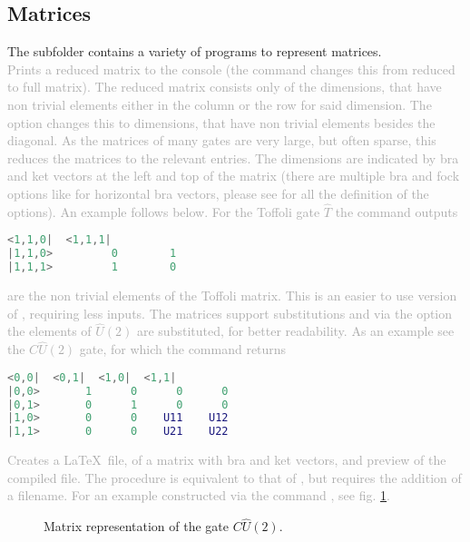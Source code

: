 \subsection{Matrices}
The subfolder  contains a variety of programs to represent matrices. \\

\textbf{} \textcolor{darkgray}{Prints a reduced matrix to the console (the  command  changes this from reduced to full matrix). The reduced matrix consists only of the dimensions, that have non trivial elements either in the column or the row for said dimension. The option  changes this to dimensions, that have non trivial elements besides the diagonal. As the matrices of many gates are very large, but often sparse, this reduces the matrices to the relevant entries. The dimensions are indicated by bra and ket vectors at the left and top of the matrix (there are multiple bra and fock options like  for horizontal bra vectors, please see  for all the definition of the options). An example follows below. For the Toffoli gate $\hat{T}$ the command  outputs}
\begin{lstlisting}[language=matlab]
            <1,1,0|  <1,1,1|
|1,1,0>         0        1
|1,1,1>         1        0
\end{lstlisting}
\textcolor{darkgray}{ are the non trivial elements of the Toffoli matrix. This is an easier to use version of , requiring less inputs. The matrices support substitutions and via the option  the elements of $\hat{U}(2)$ are substituted, for better readability. As an example see the $C\hat{U}(2)$ gate, for which the command  returns }
\newpage\begin{lstlisting}[language=matlab]
        <0,0|  <0,1|  <1,0|  <1,1|
|0,0>       1      0      0      0
|0,1>       0      1      0      0
|1,0>       0      0    U11    U12
|1,1>       0      0    U21    U22
\end{lstlisting}
\textbf{} \textcolor{darkgray}{Creates a \LaTeX\, file, of a matrix with bra and ket vectors, and preview of the compiled file. The procedure is equivalent to that of , but requires the addition of a filename. For an example constructed via the command , see fig. \ref{fig:mat_cu}. }
\begin{figure}[htb]
 \centering
  \hspace{0.2cm}
  \caption{\label{fig:mat_cu} Matrix representation of the gate $C\hat{U}(2)$. }
\end{figure}

